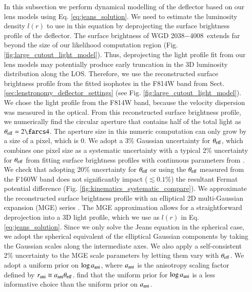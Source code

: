 \documentclass[longauth]{aa}
\newcommand{\lensname}{WGD 2038$-$4008}
\newcommand{\ajs}[1]{{{#1}}}
\newcommand{\reply}[1]{{{#1}}}
\begin{document}
In this subsection we perform dynamical modelling of the deflector based on our lens models using Eq. \ref{eq:jeans_solution}. We need to estimate the luminosity density $l(r)$ to use in this equation by deprojecting the surface brightness profile of the deflector. The surface brightness of \lensname\ extends far beyond the size of our likelihood computation region (Fig. \ref{fig:large_cutout_light_model}). Thus, deprojecting the light profile fit from our lens models may potentially produce early truncation in the 3D luminosity distribution along the LOS. Therefore, we use the reconstructed surface brightness profile from the fitted isophotes in the \ajs{F814W} band from Sect. \ref{sec:lenstronomy_deflector_settings} (see Fig. \ref{fig:large_cutout_light_model}). \ajs{We chose the light profile from the F814W band, because the velocity dispersion was measured in the optical.}
From this reconstructed surface brightness profile, we numerically find the circular aperture that contains half of the total light as $\theta_{\rm eff} = 2\farcs4$. The aperture size in this numeric computation can only grow by a size of a pixel, which is 0. We adopt a 3\% Gaussian uncertainty for $\theta_{\rm eff}$, \ajs{which combines one pixel size as a systematic uncertainty with a typical 2\% uncertainty for $\theta_{\rm eff}$ from fitting surface brightness profiles with continuous parameters from \citet{Shajib21}}. \reply{We check that adopting 20\% uncertainty for $\theta_{\rm eff}$ or using the $\theta_{\rm eff}$ measured from the F160W band does not significantly impact ($\lesssim0.1$\%) the resultant Fermat potential difference (Fig. \ref{fig:kinematics_systematic_compare}).} We approximate the reconstructed surface brightness profile with an elliptical 2D multi-Gaussian expansion (MGE) series \citep{Cappellari02}. The MGE approximation allows for a straightforward deprojection into a 3D light profile, which we use as $l(r)$ in Eq. \ref{eq:jeans_solution}. Since we only solve the Jeans equation in the spherical case, we adopt the spherical equivalent of the elliptical Gaussian components by taking the Gaussian scales along the intermediate axes. We also apply a self-consistent 2\% uncertainty to the MGE scale parameters by letting them vary with $\theta_{\rm eff}$. We adopt \ajs{a uniform prior on $\log a_{\rm ani}$}, where $a_{\rm ani}$ is the anisotropy scaling factor defined by $r_{\rm ani} \equiv a_{\rm ani}\theta_{\rm eff}$. \citet{Birrer16, Birrer20} find that \ajs{the uniform prior for $\log a_{\rm ani}$} is a less informative choice than the uniform prior \ajs{on $a_{\rm ani}$}.
\end{document}
